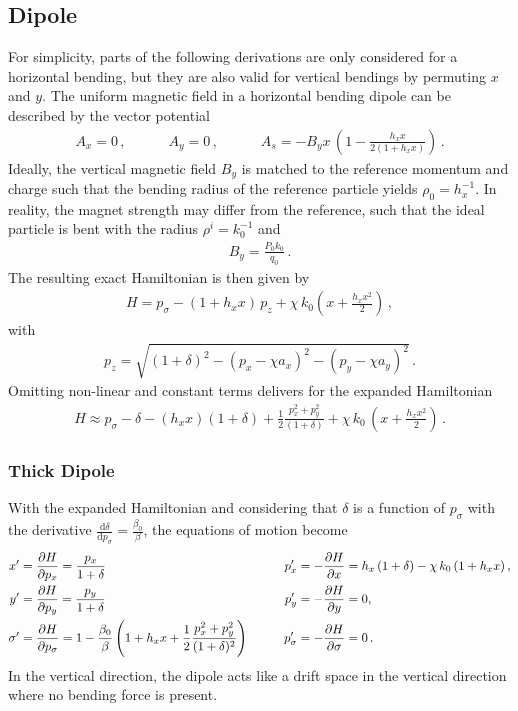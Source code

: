 \subsection{Dipole}
For simplicity, parts of the following derivations are only considered for a horizontal bending, but they are also valid for vertical bendings by permuting $x$ and $y$. The uniform magnetic field in a horizontal bending dipole can be described by the vector potential~\cite{wolski2014beam}
\begin{align}
A_x = 0 \, , \quad \quad \quad A_y =0 \, , \quad \quad \quad A_s = -B_y x \, \left( 1- \frac{h_x x}{2 (1+h_x x)} \right)\, .
\end{align}
Ideally, the vertical magnetic field $B_y$ is matched to the reference momentum and charge such that the bending radius of the reference particle yields $\rho_0=h_x^{-1}$. In reality, the magnet strength may differ from the reference, such that the ideal particle is bent with the radius $\rho^i=k_0^{-1}$ and 
\begin{align}
B_y = \frac{P_0 k_0}{q_0} \,  .
\end{align}
The resulting exact Hamiltonian is then given by
\begin{align}
H = p_\sigma - (1+h_x x)\, p_z + \chi \, k_0 \left( x + \frac{h_x x^2}{2} \right) \, ,
\end{align}
%
with
%
\begin{align}
  p_z = \sqrt{(1+\delta)^2 - (p_x - \chi a_x)^2 -(p_y - \chi a_y)^2} \, .
\end{align}
%
Omitting non-linear and constant terms delivers for the expanded Hamiltonian 
\begin{align}
H \approx p_\sigma - \delta - (h_x x) (1+\delta) + \frac{1}{2} \frac{p_x^2 + p_y^2}{(1+\delta)} + \chi \, k_0 \, \left(x + \frac{h_x x^2}{2}\right) \, . \label{eq:exp_dipole}
\end{align}


\subsubsection{Thick Dipole}
%
With the expanded Hamiltonian and considering that $\delta$ is a function of $p_\sigma$ with the derivative $\frac{\mathrm{d} \delta}{\mathrm{d} p_\sigma} = \frac{\beta_0}{\beta}$, the equations of motion become
%
%
\begin{alignat}{4}
  x' &=  \frac{\partial H}{\partial p_x} = \frac{p_x}{1+\delta} \quad \quad \quad \quad &p_x' &= -\frac{\partial H}{\partial x} = h_x \, (1+\delta) - \chi \, k_0 \, (1+h_x x)  \, , \label{eq:dipoleequationofmotion} \\ 
  y' &= \frac{\partial H}{\partial p_y} = \frac{p_y}{1+\delta} \quad \quad &p_y' &= -\frac{\partial H}{\partial y} = 0 ,  \\
  \sigma' &=  \frac{\partial H}{\partial p_\sigma} =  1 - \frac{\beta_0}{\beta} \left( 1+h_x x + \frac{1}{2} \frac{p_x^2 + p_y^2}{(1+\delta)^2} \right) \quad \quad  &p_\sigma' &= -\frac{\partial H}{\partial \sigma} = 0 \, . 
\end{alignat}
%
In the vertical direction, the dipole acts like a drift space in the vertical direction where no bending force is present. 

